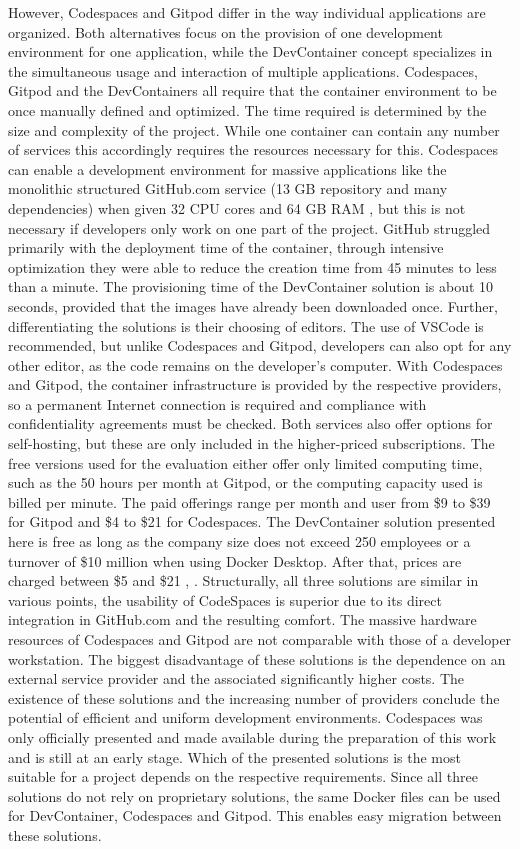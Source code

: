 However, Codespaces and Gitpod differ in the way individual applications are organized. Both alternatives focus on the provision of one development environment for one application, while the DevContainer concept specializes in the simultaneous usage and interaction of multiple applications. Codespaces, Gitpod and the DevContainers all require that the container environment to be once manually defined and optimized. The time required is determined by the size and complexity of the project. While one container can contain any number of services this accordingly requires the resources necessary for this. Codespaces can enable a development environment for massive applications like the monolithic structured GitHub.com service (13 GB repository and many dependencies) when given 32 CPU cores and 64 GB RAM \cite{githubblogcodespace}, but this is not necessary if developers only work on one part of the project. GitHub struggled primarily with the deployment time of the container, through intensive optimization they were able to reduce the creation time from 45 minutes to less than a minute. The provisioning time of the DevContainer solution is about 10 seconds, provided that the images have already been downloaded once. Further, differentiating the solutions is their choosing of editors. The use of VSCode is recommended, but unlike Codespaces and Gitpod, developers can also opt for any other editor, as the code remains on the developer's computer.  With Codespaces and Gitpod, the container infrastructure is provided by the respective providers, so a permanent Internet connection is required and compliance with confidentiality agreements must be checked. Both services also offer options for self-hosting, but these are only included in the higher-priced subscriptions. The free versions used for the evaluation either offer only limited computing time, such as the 50 hours per month at Gitpod, or the computing capacity used is billed per minute. The paid offerings range per month and user from \$9 to \$39 for Gitpod and \$4 to \$21 for Codespaces. The DevContainer solution presented here is free as long as the company size does not exceed 250 employees or a turnover of \$10 million when using Docker Desktop. After that, prices are charged between \$5 and \$21 \cite{gitpod}, \cite{githubblogcodespace}.
Structurally, all three solutions are similar in various points, the usability of CodeSpaces is superior due to its direct integration in GitHub.com and the resulting comfort. The massive hardware resources of Codespaces and Gitpod are not comparable with those of a developer workstation. The biggest disadvantage of these solutions is the dependence on an external service provider and the associated significantly higher costs. The existence of these solutions and the increasing number of providers conclude the potential of efficient and uniform development environments. Codespaces was only officially presented and made available during the preparation of this work and is still at an early stage. Which of the presented solutions is the most suitable for a project depends on the respective requirements. Since all three solutions do not rely on proprietary solutions, the same Docker files can be used for DevContainer, Codespaces and Gitpod. This enables easy migration between these solutions.


